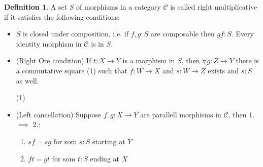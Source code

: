 \documentclass[12pt]{article}
\theoremstyle{definition}
\newtheorem{definition}{Definition}[section]
\theoremstyle{remark}
\begin{document}
            \begin{definition}
                A set $S$ of morphisms in a category $\mathcal{C}$ is called right multiplicative if it satisfies the following conditions:
                \begin{itemize}
                    \item $S$ is closed under composition, i.e. if $f,g : S$ are composable then $gf : S$. Every identity morphism in $\mathcal{C}$ is in $S$.
                    \item (Right Ore condition) If $t : X \rightarrow Y$ is a morphism in $S$, then $\forall g:Z\rightarrow Y$ there is a commutative square (1) such that $f:W\rightarrow X$ and $s:W\rightarrow Z$ exists and $s:S$ as well.
                    \begin{center}
                        (1)
                    \end{center}
                    \item (Left cancellation) Suppose $f,g:X\rightarrow Y$ are parallell morphisms in $\mathcal{C}$, then 1. $\implies$ 2.:
                    \begin{enumerate}
                        \item $sf = sg$ for som $s:S$ starting at $Y$
                        \item $ft = gt$ for som $t:S$ ending at $X$
                    \end{enumerate}
                \end{itemize}
            \end{definition}
\end{document}
